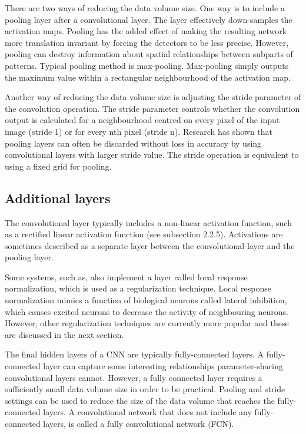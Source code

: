 There are two ways of reducing the data volume size. One way is to include a pooling layer after a convolutional layer. The layer effectively down-samples the activation maps. Pooling has the added effect of making the resulting network more translation invariant by forcing the detectors to be less precise. However, pooling can destroy information about spatial relationships between subparts of patterns. Typical pooling method is max-pooling. Max-pooling simply outputs the maximum value within a rectangular neighbourhood of the activation map.

Another way of reducing the data volume size is adjusting the stride parameter of the convolution operation. The stride parameter controls whether the convolution output is calculated for a neighbourhood centred on every pixel of the input image (stride 1) or for every nth pixel (stride n). Research has shown that pooling layers can often be discarded without loss in accuracy by using convolutional layers with larger stride value. The stride operation is equivalent to using a fixed grid for pooling.

\subsection{Additional layers}
The convolutional layer typically includes a non-linear activation function, such as a rectified linear activation function (see subsection 2.2.5). Activations are sometimes described as a separate layer between the convolutional layer and the pooling layer.

Some systems, such as, also implement a layer called local response normalization, which is used as a regularization technique. Local response normalization mimics a function of biological neurons called lateral inhibition, which causes excited neurons to decrease the activity of neighbouring neurons. However, other regularization techniques are currently more popular and these are discussed in the next section.

The final hidden layers of a CNN are typically fully-connected layers. A fully-connected layer can capture some interesting relationships parameter-sharing convolutional layers cannot. However, a fully connected layer requires a sufficiently small data volume size in order to be practical. Pooling and stride settings can be used to reduce the size of the data volume that reaches the fully-connected layers. A convolutional network that does not include any fully-connected layers, is called a fully convolutional network (FCN).

